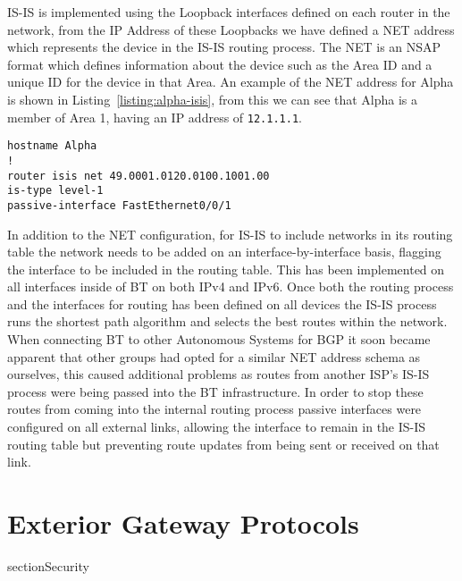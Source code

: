 IS-IS is implemented using the Loopback interfaces defined on each router in the
network, from the IP Address of these Loopbacks we have defined a NET address
which represents the device in the IS-IS routing process. The NET is an NSAP
format which defines information about the device such as the Area ID and a
unique ID for the device in that Area. An example of the NET address for Alpha
is shown in Listing~\ref{listing:alpha-isis}, from this we can see that Alpha is
a member of Area 1, having an IP address of \texttt{12.1.1.1}.

\begin{lstlisting}[caption={Alpha IS-IS Configuration}, label={listing:alpha-isis}]
hostname Alpha 
!  
router isis net 49.0001.0120.0100.1001.00  
is-type level-1  
passive-interface FastEthernet0/0/1  
\end{lstlisting}

In addition to the NET configuration, for IS-IS to include networks in its
routing table the network needs to be added on an interface-by-interface basis,
flagging the interface to be included in the routing table. This has been
implemented on all interfaces inside of BT on both IPv4 and IPv6. Once both the
routing process and the interfaces for routing has been defined on all devices
the IS-IS process runs the shortest path algorithm and selects the best routes
within the network. When connecting BT to other Autonomous Systems for BGP it
soon became apparent that other groups had opted for a similar NET address
schema as ourselves, this caused additional problems as routes from another
ISP's IS-IS process were being passed into the BT infrastructure. In order to
stop these routes from coming into the internal routing process passive
interfaces were configured on all external links, allowing the interface to
remain in the IS-IS routing table but preventing route updates from being sent
or received on that link.

\section{Exterior Gateway Protocols} section{Security}

